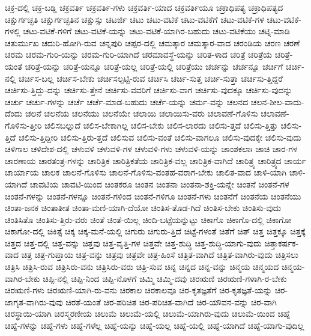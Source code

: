 {ಚಕ್ರ-ದಲ್ಲಿ
ಚಕ್ರ-ಬಡ್ಡಿ
ಚಕ್ರವರ್ತಿ
ಚಕ್ರವರ್ತಿ-ಗಳು
ಚಕ್ರವರ್ತಿ-ಯಾದ
ಚಕ್ರವರ್ತಿಯೂ
ಚಕ್ರಾಧಿಪತ್ಯ
ಚಕ್ರಾಧಿಪತ್ಯದ
ಚಕ್ಷುರ್ಗಚ್ಛತಿ
ಚಕ್ಷುರ್ಗಚ್ಛತಿನ
ಚಕ್ಷುಸ್ಸು
ಚಟರ್ಜಿ
ಚಟು
ಚಟು-ವಟಿಕೆ
ಚಟು-ವಟಿಕೆಗೆ
ಚಟು-ವಟಿಕೆ-ಗಳ
ಚಟು-ವಟಿಕೆ-ಗಳಲ್ಲಿ
ಚಟು-ವಟಿಕೆ-ಗಳಿಗೆ
ಚಟು-ವಟಿಕೆ-ಯನ್ನು
ಚಟು-ವಟಿಕೆ-ಯಾಗಿರ-ಬಹುದು
ಚಟು-ವಟಿಕೆಯು
ಚಟ್ನಿ-ಮಾಡಿ
ಚತುರ್ಮುಖ
ಚದುರಿ-ಹೋಗಿ-ರುವ
ಚನ್ನಪುರಿ
ಚಪ್ಪರ-ದಲ್ಲಿ
ಚಮತ್ಕಾರ
ಚಮತ್ಕಾರ-ವಾದ
ಚರಂಡಿಯ
ಚರಣ
ಚರಣೆ
ಚರಮ
ಚರಮ-ಗುರಿ-ಯನ್ನು
ಚರಮ-ಗುರಿ-ಯಾಗಿದೆ
ಚರಮಾವಸ್ಥೆ-ಯನ್ನು
ಚರಿತ-ಳಾದ
ಚರಿತ್ರೆ
ಚರಿತ್ರೆಯ
ಚರಿತ್ರೆ-ಯಂತೆ
ಚರಿತ್ರೆ-ಯನ್ನು
ಚರಿತ್ರೆ-ಯನ್ನೂ
ಚರಿತ್ರೆ-ಯಲ್ಲ
ಚರಿತ್ರೆ-ಯಲ್ಲಿ
ಚರಿತ್ರೆಯು
ಚರ್ಚನ್ನು
ಚರ್ಚನ್ನೂ
ಚರ್ಚಿಗೆ
ಚರ್ಚಿ-ನಲ್ಲಿ
ಚರ್ಚಿಸ-ಬಲ್ಲ
ಚರ್ಚಿಸ-ಬೇಕು
ಚರ್ಚಿಸಲ್ಪಟ್ಟಿ-ರುವ
ಚರ್ಚಿಸಿ
ಚರ್ಚಿ-ಸುತ್ತ
ಚರ್ಚಿ-ಸುತ್ತಾ
ಚರ್ಚಿಸು-ತ್ತಿದ್ದರೆ
ಚರ್ಚಿಸು-ತ್ತಿದ್ದು-ದನ್ನು
ಚರ್ಚಿಸು-ತ್ತೇನೆ
ಚರ್ಚಿಸು-ವವರಿಗೆ
ಚರ್ಚಿಸು-ವಾಗ
ಚರ್ಚಿಸು-ವುದಕ್ಕೂ
ಚರ್ಚಿಸು-ವುದನ್ನು
ಚರ್ಚು
ಚರ್ಚು-ಗಳನ್ನು
ಚರ್ಚೆ
ಚರ್ಚೆ-ಮಾಡ-ಬಹುದು
ಚರ್ಚೆ-ಯನ್ನು
ಚರ್ಮ-ವನ್ನು
ಚಲನದ
ಚಲನ-ಶೀಲ-ವಾದು-ದೆಂದು
ಚಲನೆ
ಚಲನೆಯ
ಚಲನೆಯು
ಚಲನೆಯೇ
ಚಲಾಯಿ
ಚಲಾಯಿಸು-ವರು
ಚಲಾವಣೆ-ಗೊಳಿಸು
ಚಲಾವಣೆ-ಗೊಳಿಸು-ತ್ತೀರಿ
ಚಲಿಸಬಲ್ಲುದೆ
ಚಲಿಸ-ಬೇಕಾಗಿಲ್ಲ
ಚಲಿಸ-ಬೇಕು
ಚಲಿಸ-ಲಾರದು
ಚಲಿಸು-ತ್ತದೆ
ಚಲಿಸು-ತ್ತಿತ್ತು
ಚಲಿಸು-ತ್ತಿದೆ
ಚಲಿಸು-ತ್ತಿದ್ದೀರಿ
ಚಲಿಸು-ತ್ತಿರು-ತ್ತದೆ
ಚಲಿಸುವ
ಚಲಿಸು-ವಂತೆ
ಚಲಿಸು-ವಾಗಲೂ
ಚಲಿಸು-ವುದಕ್ಕೇ
ಚಲಿಸು-ವುದು
ಚಳಿಗಾಲ
ಚಳಿದೇಶ-ದಲ್ಲಿ
ಚಳುವಳಿ
ಚಳುವಳಿ-ಗಳ
ಚಳುವಳಿ-ಗಳು
ಚಳುವಳಿ-ಯನ್ನು
ಚಾಂಶಕಲಾಃ
ಚಾಚಿ
ಚಾರ-ಗಳ
ಚಾರಣಾಯ
ಚಾರತಂತ್ರ-ಗಳನ್ನು
ಚಾರಿತ್ರಿಕ
ಚಾರಿತ್ರಿಕತೆಯ
ಚಾರಿತ್ರಿಕ-ವಲ್ಲ
ಚಾರಿತ್ರಿಕ-ವಾಗಿದೆ
ಚಾರಿತ್ರ್ಯ
ಚಾರಿತ್ರ್ಯದ
ಚಾರ್ಯ
ಚಾರ್ಯಾಯ
ಚಾಲಕ
ಚಾಲನೆ-ಗೊಳಿಸು
ಚಾಲನೆ-ಗೊಳಿಸು-ವಂತಹ-ವರಾಗ-ಬೇಕು
ಚಾಲಿತ-ವಾದ
ಚಾಳಿ-ಯಾಗಿ
ಚಾಳಿ-ಯಾಗಿದೆ
ಚಾವಟಿಯ
ಚಾವಟಿ-ಯಿಂದ
ಚಿಂತಕರೂ
ಚಿಂತನ
ಚಿಂತನಾ
ಚಿಂತನಾ-ಶಕ್ತಿ-ಯನ್ನೇ
ಚಿಂತನೆ
ಚಿಂತನೆ-ಗಳ
ಚಿಂತನೆ-ಗಳನ್ನು
ಚಿಂತನೆ-ಗಳನ್ನೂ
ಚಿಂತನೆ-ಗಳಿಂದ
ಚಿಂತನೆ-ಗಳಿಗೂ
ಚಿಂತನೆ-ಗಳು
ಚಿಂತನೆಗೆ
ಚಿಂತನೆಯ
ಚಿಂತನೆಯು
ಚಿಂತಾ-ಜನಕ
ಚಿಂತಾತೀತ
ಚಿಂತಾ-ಮಣಿ-ಯಾಗಿ-ದೆಯೋ
ಚಿಂತಿಸ-ತೊಡ-ಗಿದೆ
ಚಿಂತಿಸ-ಬೇಕು
ಚಿಂತಿಸು-ವುದು
ಚಿಂತಿಸಿತೊ
ಚಿಂತಿಸು-ತ್ತಿರು-ವರು
ಚಿಂತೆ
ಚಿಂತೆ-ಯಿಲ್ಲ
ಚಿಂದಿ-ಬಟ್ಟೆಯನ್ನುಟ್ಟು
ಚಿಕಾಗೊ
ಚಿಕಾಗೊ-ದಲ್ಲಿ
ಚಿಕಾಗೋ
ಚಿಕಾಗೋ-ದಲ್ಲಿ
ಚಿಕಿತ್ಸೆ
ಚಿಕ್ಕ
ಚಿಕ್ಕ-ಮನೆ-ಯಲ್ಲಿ
ಚಿಗುರು
ಚಿಗುರು-ತ್ತಿದೆ
ಚಿಟ್ಟೆ-ಗಳಂತೆ
ಚಿತೆಗೆ
ಚಿತ್
ಚಿತ್ತ
ಚಿತ್ತಕ್ಕೂ
ಚಿತ್ತಕ್ಕೆ
ಚಿತ್ತದ
ಚಿತ್ತ-ದಲ್ಲಿ
ಚಿತ್ತ-ವನ್ನು
ಚಿತ್ತವು
ಚಿತ್ತ-ವೃತ್ತಿ-ಗಳ
ಚಿತ್ತವೇ
ಚಿತ್ತ-ಶುದ್ಧಿ
ಚಿತ್ತ-ಶುದ್ಧಿ-ಯಾಗು-ವುದು
ಚಿತ್ತಾಕರ್ಷಕ-ವಾದ
ಚಿತ್ರ
ಚಿತ್ರ-ಗುಪ್ತಾಯ
ಚಿತ್ರ-ವನ್ನು
ಚಿತ್ರವು
ಚಿತ್ರವೇ
ಚಿತ್ರ-ಹಿಂಸೆ
ಚಿತ್ರಿತ-ವಾಗಿದೆ
ಚಿತ್ರಿತ-ವಾಗಿರು-ವುದು
ಚಿತ್ರಿಸಲು
ಚಿತ್ರಿಸಿ
ಚಿತ್ರಿಸಿ-ರುವ
ಚಿತ್ರಿಸಿರು-ವನು
ಚಿತ್ರಿಸಿರು-ವರು
ಚಿತ್ರಿ-ಸುವ
ಚಿನ್ನ
ಚಿನ್ನದ
ಚಿನ್ನ-ವನ್ನು
ಚಿನ್ಮಯ
ಚಿನ್ಮಯದ
ಚಿನ್ಮಯ-ವಾಗಿರ-ಬೇಕು
ಚಿಪ್ಪಿ-ನಲ್ಲಿ
ಚಿಪ್ಪಿ-ನಿಂದ
ಚಿಪ್ಪಿ-ನೊಳಗೆ
ಚಿಮ್ಮಿ
ಚಿಮ್ಮಿ-ದವು
ಚಿರಋಣಿ
ಚಿರಋಣಿ-ಗಳಾಗಿ-ರ-ಬೇಕು
ಚಿರಋಣಿ-ಗಳು
ಚಿರಋಣಿ-ಯಾಗಿ-ರು-ವನು
ಚಿರಕಾಲ
ಚಿರಕಾಲವೂ
ಚಿರ-ಕೃತಜ್ಞತೆಗೆ
ಚಿರ-ಕೃತಜ್ಞತೆ-ಯನ್ನು
ಚಿರ-ಜಾಗೃತ-ವಾಗಿರು-ವುವು
ಚಿರತೆ-ಯಂತೆ
ಚಿರ-ಪರಿಚಿತ
ಚಿರ-ಪರಿಚಿತ-ವಾಗಿದೆ
ಚಿರ-ಯೌವನ-ವನ್ನು
ಚಿರ-ವಾಗಿ
ಚಿರಸ್ಥಾಯಿ-ಯಾಗಿ
ಚಿರಸ್ಮರಣೀಯ
ಚಿಲುಮೆ
ಚಿಲುಮೆ-ಯಲ್ಲಿ
ಚಿಲುಮೆ-ಯಾಗಿರು-ವುದು
ಚಿಲುಮೆ-ಯಿಂದ
ಚಿಹ್ನೆ
ಚಿಹ್ನೆ-ಗಳನ್ನು
ಚಿಹ್ನೆ-ಗಳು
ಚಿಹ್ನೆ-ಗಳೆಲ್ಲ
ಚಿಹ್ನೆ-ಯನ್ನು
ಚಿಹ್ನೆ-ಯಲ್ಲ
ಚಿಹ್ನೆ-ಯಲ್ಲಿ
ಚಿಹ್ನೆ-ಯಾಗಿದೆ
ಚಿಹ್ನೆ-ಯಾಗು-ವುದಿಲ್ಲ
}
